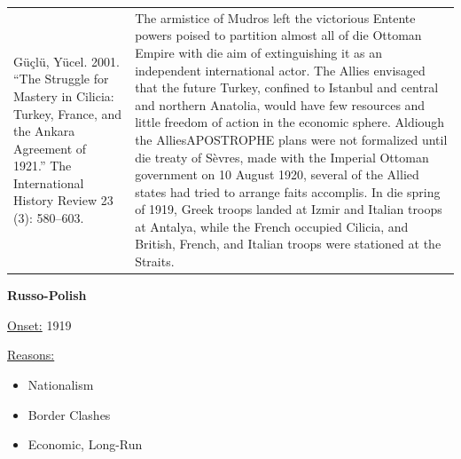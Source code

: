{\begin{longtable}{p{}p{}}
\\
Güçlü, Yücel. 2001. “The Struggle for Mastery in Cilicia: Turkey, France, and the Ankara Agreement of 1921.” The International History Review 23 (3): 580–603.
 & The armistice of Mudros left the victorious Entente powers poised to partition almost all of die Ottoman Empire with die aim of extinguishing it as an independent international actor. The Allies envisaged that the future Turkey, confined to Istanbul and central and northern Anatolia, would have few resources and little freedom of action in the economic sphere. Aldiough the AlliesAPOSTROPHE plans were not formalized until die treaty of Sèvres, made with the Imperial Ottoman government on 10 August 1920, several of the Allied states had tried to arrange faits accomplis. In die spring of 1919, Greek troops landed at Izmir and Italian troops at Antalya, while the French occupied Cilicia, and British, French, and Italian troops were stationed at the Straits.
\\
\end{longtable}}
\clearpage
         \textbf{Russo-Polish} 

          \underline{Onset:} 1919         

\underline{Reasons:}
\begin{itemize}
\item Nationalism
\item Border Clashes
\item Economic, Long-Run
\end{itemize}

